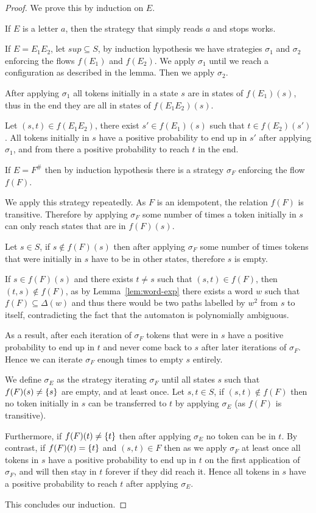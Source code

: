 \documentclass{article}
\begin{document}
\begin{proof}
	We prove this by induction on $E$.
	
	If $E$ is a letter $a$, then the strategy that simply reads $a$ and stops works.
	
	If $E = E_1 E_2$, let $sup \subseteq S$, by induction hypothesis we have strategies $\sigma_1$ and $\sigma_2$ enforcing the flows $f(E_1)$ and $f(E_2)$.
	We apply $\sigma_1$ until we reach a configuration as described in the lemma.
	Then we apply $\sigma_2$.
	
	After applying $\sigma_1$ all tokens initially in a state $s$ are in states of $f(E_1)(s)$, thus in the end they are all in states of $f(E_1E_2)(s)$.
	
	Let $(s,t) \in f(E_1E_2)$, there exist $s' \in f(E_1)(s)$ such that $t \in f(E_2) (s')$. All tokens initially in $s$ have a positive probability to end up in $s'$ after applying $\sigma_1$, and from there a positive probability to reach $t$ in the end.
	
	If $E= F^\#$ then by induction hypothesis there is a strategy $\sigma_F$ enforcing the flow $f(F)$.
	
	We apply this strategy repeatedly.
	As $F$ is an idempotent, the relation $f(F)$ is transitive.
	Therefore by applying $\sigma_F$ some number of times a token initially in $s$ can only reach states that are in $f(F)(s)$.
	
	Let $s \in S$, if $s \notin f(F)(s)$ then after applying $\sigma_F$ some number of times tokens that were initially in $s$ have to be in other states, therefore $s$ is empty.
	
	If $s \in f(F)(s)$ and there exists $t \neq s$ such that $(s,t) \in f(F)$, then $(t, s) \notin f(F)$, as by Lemma~\ref{lem:word-exp} there exists a word $w$ such that $f(F) \subseteq \Delta(w)$ and thus there would be two paths labelled by $w^2$ from $s$ to itself, contradicting the fact that the automaton is polynomially ambiguous.
	
	As a result, after each iteration of $\sigma_F$ tokens that were in $s$ have a positive probability to end up in $t$ and never come back to $s$ after later iterations of $\sigma_F$. Hence we can iterate $\sigma_F$ enough times to empty $s$ entirely.
	
	We define $\sigma_E$ as the strategy iterating $\sigma_F$ until all states $s$ such that $f(F)(s) \neq \{ s \}$ are empty, and at least once.
	Let $s,t \in S$, if $(s,t) \notin f(F)$ then no token initially in $s$ can be transferred to $t$ by applying $\sigma_E$ (as $f(F)$ is transitive).
	
	Furthermore, if $f(F)(t) \neq \{ t \}$ then after applying $\sigma_E$ no token can be in $t$. By contrast, if $f(F)(t) = \{ t \}$ and $(s,t) \in F$ then as we apply $\sigma_F$ at least once all tokens in $s$ have a positive probability to end up in $t$ on the first application of $\sigma_F$, and will then stay in $t$ forever if they did reach it. Hence all tokens in $s$ have a positive probability to reach $t$ after applying $\sigma_E$.
	
	This concludes our induction. 
\end{proof}
\end{document}
